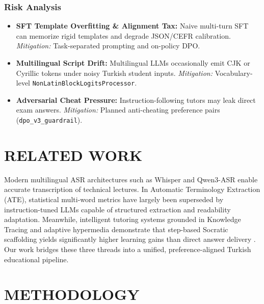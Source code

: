 \documentclass[a4paper,12pt]{report}
\begin{document}
\subsection{Risk Analysis}
\begin{itemize}
    \item \textbf{SFT Template Overfitting \& Alignment Tax:} Naive multi-turn SFT can memorize rigid templates and degrade JSON/CEFR calibration. \textit{Mitigation:} Task-separated prompting and on-policy DPO.
    \item \textbf{Multilingual Script Drift:} Multilingual LLMs occasionally emit CJK or Cyrillic tokens under noisy Turkish student inputs. \textit{Mitigation:} Vocabulary-level \texttt{NonLatinBlockLogitsProcessor}.
    \item \textbf{Adversarial Cheat Pressure:} Instruction-following tutors may leak direct exam answers. \textit{Mitigation:} Planned anti-cheating preference pairs (\texttt{dpo\_v3\_guardrail}).
\end{itemize}

\chapter{RELATED WORK}

Modern multilingual ASR architectures such as Whisper \cite{radford2023,whisper-turbo} and Qwen3-ASR \cite{qwen3asr2026} enable accurate transcription of technical lectures. In Automatic Terminology Extraction (ATE), statistical multi-word metrics \cite{frantzi2000} have largely been superseded by instruction-tuned LLMs capable of structured extraction and readability adaptation. Meanwhile, intelligent tutoring systems grounded in Knowledge Tracing \cite{corbett1995} and adaptive hypermedia \cite{brusilovsky2007} demonstrate that step-based Socratic scaffolding yields significantly higher learning gains than direct answer delivery \cite{vanlehn2011}. Our work bridges these three threads into a unified, preference-aligned Turkish educational pipeline.

\chapter{METHODOLOGY}
\end{document}
